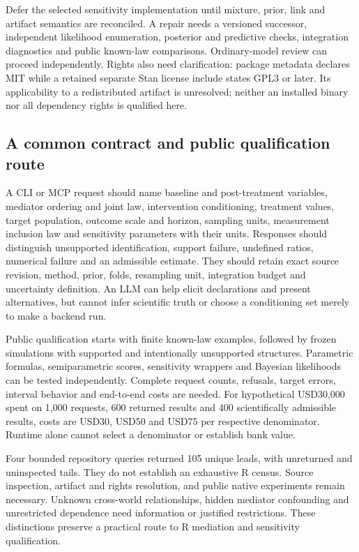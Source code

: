 Defer the selected sensitivity implementation until mixture, prior, link and
artifact semantics are reconciled. A repair needs a versioned successor,
independent likelihood enumeration, posterior and predictive checks,
integration diagnostics and public known-law comparisons. Ordinary-model
review can proceed independently. Rights also need clarification: package
metadata declares MIT while a retained separate Stan license include states
GPL3 or later. Its applicability to a redistributed artifact is unresolved;
neither an installed binary nor all dependency rights is qualified here.
\citep{exec25_rmed_bayesgmed,exec25_rmed_choice}

\subsection{A common contract and public qualification route}

A CLI or MCP request should name baseline and post-treatment variables,
mediator ordering and joint law, intervention conditioning, treatment values,
target population, outcome scale and horizon, sampling units, measurement
inclusion law and sensitivity parameters with their units. Responses should
distinguish unsupported identification, support failure, undefined ratios,
numerical failure and an admissible estimate. They should retain exact source
revision, method, prior, folds, resampling unit, integration budget and
uncertainty definition. An LLM can help elicit declarations and present
alternatives, but cannot infer scientific truth or choose a conditioning set
merely to make a backend run. \citep{exec25_rmed_choice}

Public qualification starts with finite known-law examples, followed by frozen
simulations with supported and intentionally unsupported structures. Parametric
formulas, semiparametric scores, sensitivity wrappers and Bayesian likelihoods
can be tested independently. Complete request counts, refusals, target errors,
interval behavior and end-to-end costs are needed. For hypothetical USD30,000
spent on 1,000 requests, 600 returned results and 400 scientifically admissible
results, costs are USD30, USD50 and USD75 per respective denominator. Runtime
alone cannot select a denominator or establish bank value. \citep{exec25_rmed_choice}

Four bounded repository queries returned 105 unique leads, with unreturned
and uninspected tails. They do not establish an exhaustive R census. Source
inspection, artifact and rights resolution, and public native experiments
remain necessary. Unknown cross-world relationships, hidden mediator
confounding and unrestricted dependence need information or justified
restrictions. These distinctions preserve a practical route to R mediation
and sensitivity qualification. \citep{exec25_rmed_choice}

